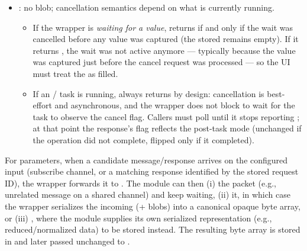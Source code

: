 \begin{itemize}
    Polling  therefore allows the UI to (a) detect when the wrapper is no longer busy, (b) render module-reported progress, and (c) observe whether the module ended up activated or deactivated once the task terminates.
    \item {}: no blob; cancellation semantics depend on what is currently running.
    \begin{itemize}
        \item If the wrapper is \emph{waiting for a  value},  returns  if and only if the wait was cancelled before any value was captured (the stored  remains empty). If it returns , the wait was not active anymore --- typically because the value was captured just before the cancel request was processed --- so the UI must treat the  as filled.
        \item If an / task is running,  always returns  by design: cancellation is best-effort and asynchronous, and the wrapper does not block to wait for the task to observe the cancel flag. Callers must poll  until it stops reporting ; at that point the response's  flag reflects the post-task mode (unchanged if the operation did not complete, flipped only if it completed).
    \end{itemize}
\end{itemize}
For  parameters, when a candidate message/response arrives on the configured input (subscribe channel, or a matching response identified by the stored request ID), the wrapper forwards it to .
The module can then (i)  the packet (e.g., unrelated message on a shared channel) and keep waiting, (ii)  it, in which case the wrapper serializes the incoming  (+ blobs) into a canonical opaque byte array, or (iii) , where the module supplies its own serialized representation (e.g., reduced/normalized data) to be stored instead.
The resulting byte array is stored in  and later passed unchanged to .

